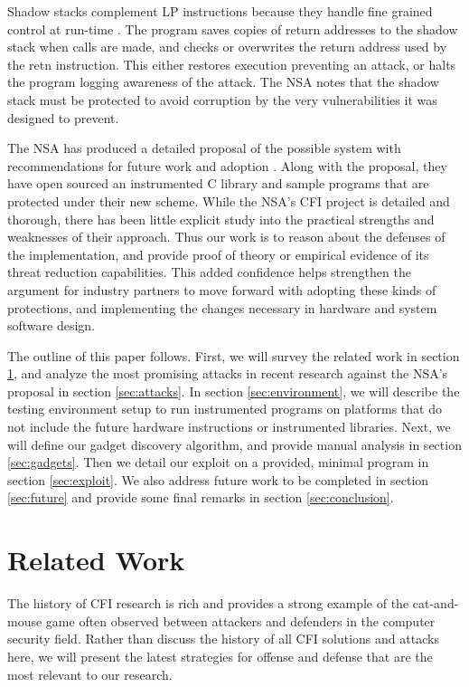 \documentclass[conference,compsoc]{IEEEtran}
\begin{document}
Shadow stacks complement LP instructions because they handle fine grained control at run-time \cite{abadi}. The program saves copies of return addresses to the shadow stack when calls are made, and checks or overwrites the return address used by the retn instruction. This either restores execution preventing an attack, or halts the program logging awareness of the attack. The NSA notes that the shadow stack must be protected to avoid corruption by the very vulnerabilities it was designed to prevent.

The NSA has produced a detailed proposal of the possible system with recommendations for future work and adoption \cite{NSAGitHub}. Along with the proposal, they have open sourced an instrumented C library and sample programs that are protected under their new scheme. While the NSA’s CFI project is detailed and thorough, there has been little explicit study into the practical strengths and weaknesses of their approach. Thus our work is to reason about the defenses of the implementation, and provide proof of theory or empirical evidence of its threat reduction capabilities. This added confidence helps strengthen the argument for industry partners to move forward with adopting these kinds of protections, and implementing the changes necessary in hardware and system software design.

The outline of this paper follows. First, we will survey the related work in section \ref{sec:related}, and analyze the most promising attacks in recent research against the NSA's proposal in section \ref{sec:attacks}. In section \ref{sec:environment}, we will describe the testing environment setup to run instrumented programs on platforms that do not include the future hardware instructions or instrumented libraries. Next, we will define our gadget discovery algorithm, and provide manual analysis in section \ref{sec:gadgets}. Then we detail our exploit on a provided, minimal program in section \ref{sec:exploit}. We also address future work to be completed in section \ref{sec:future} and provide some final remarks in section \ref{sec:conclusion}.

\section{Related Work}\label{sec:related}

The history of CFI research is rich and provides a strong example of the cat-and-mouse game often observed between attackers and defenders in the computer security field. Rather than discuss the history of all CFI solutions and attacks here, we will present the latest strategies for offense and defense that are the most relevant to our research.
\end{document}
